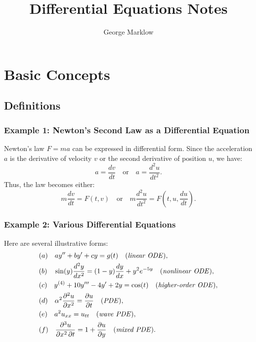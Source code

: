 \documentclass[12pt]{book}
\begin{document}
\frontmatter
\title{Differential Equations Notes}
\author{George Marklow}
\maketitle
\tableofcontents

\mainmatter

\chapter{Basic Concepts}
\section{Definitions}

\subsection*{Example 1: Newton’s Second Law as a Differential Equation}
Newton’s law \(F = ma\) can be expressed in differential form. Since the acceleration \(a\) is the derivative of velocity \(v\) or the second derivative of position \(u\), we have:
\[
a = \frac{dv}{dt} \quad \text{or} \quad a = \frac{d^2u}{dt^2}.
\]
Thus, the law becomes either:
\[
m \frac{dv}{dt} = F(t, v)
\quad\text{or}\quad
m \frac{d^2u}{dt^2} = F\left(t, u, \frac{du}{dt}\right).
\]

\subsection*{Example 2: Various Differential Equations}
Here are several illustrative forms:
\begin{align*}
& (a)\quad ay'' + by' + cy = g(t) \quad\text{(\emph{linear ODE})},\\
& (b)\quad \sin(y)\frac{d^2y}{dx^2} = (1 - y)\frac{dy}{dx} + y^2 e^{-5y} \quad\text{(\emph{nonlinear ODE})},\\
& (c)\quad y^{(4)} + 10y''' - 4y' + 2y = \cos(t) \quad\text{(\emph{higher-order ODE})},\\
& (d)\quad \alpha^2 \frac{\partial^2 u}{\partial x^2} = \frac{\partial u}{\partial t} \quad\text{(\emph{PDE})},\\
& (e)\quad a^2 u_{xx} = u_{tt} \quad\text{(\emph{wave PDE})},\\
& (f)\quad \frac{\partial^3 u}{\partial x^2\,\partial t} = 1 + \frac{\partial u}{\partial y} \quad\text{(\emph{mixed PDE})}.
\end{align*}
\end{document}
